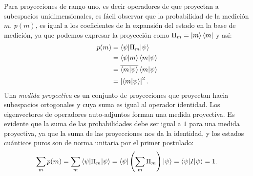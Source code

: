 \documentclass[a4paper,11pt]{report}
\begin{document}
  Para proyecciones de rango uno, es decir operadores de que
  proyectan a subespacios unidimensionales, es fácil
  observar que la probabilidad de la medición $m$, $p(m)$,
  es igual a los coeficientes de la expansión del estado
  en la base de medición, ya que podemos expresar la
  proyección como $\Pi_m = \ket m \bra m$ y así:
  \begin{align}
    p(m)
    &= \braket{\psi|\Pi_m|\psi} \\
    &= \braket{\psi|m} \braket{m|\psi} \\
    &= \overline{\braket{m|\psi}} \braket{m|\psi} \\
    &= \left|\langle m|\psi \rangle\right|^2.
  \end{align}
  Una \textit{medida proyectiva} es un conjunto de
  proyecciones que proyectan hacia subespacios ortogonales y
  cuya suma es igual al operador identidad. Los
  eigenvectores de operadores auto-adjuntos forman una
  medida proyectiva.  Es evidente que la suma de las
  probabilidades debe ser igual a $1$ para una medida
  proyectiva, ya que la suma de las proyecciones nos da la
  identidad, y los estados cuánticos puros son de norma
  unitaria por el primer postulado:
  \begin{equation}
    \sum_{m}^{} p(m)
    = \sum_{m}^{} \braket{\psi|\Pi_m|\psi}
    = \braket{\psi|\left( \sum_{m}^{} \Pi_m \right)|\psi}
    = \braket{\psi|I|\psi}
    = 1.
  \end{equation}
\end{document}
